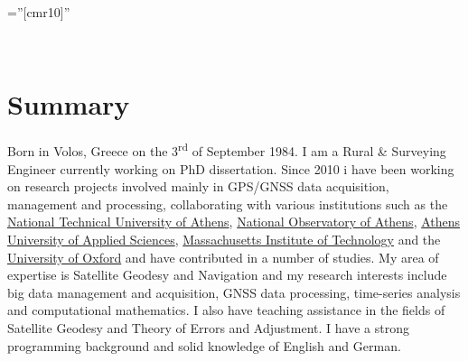 \documentclass[9pt]{extarticle} %
\begin{document}
\pagestyle{empty} %
\font\fb=''[cmr10]'' %

\par{\bigskip\par} %
%
\\
%
\medskip
%
\medskip

\section{Summary} \par
Born in Volos, Greece on the 3\textsuperscript{rd} of September 1984.
I am a Rural \& Surveying Engineer currently working on PhD dissertation. Since 2010 i have been working on research 
projects involved mainly in GPS/GNSS data acquisition, management and processing, collaborating with various 
institutions such as the \href{http://www.ntua.gr/}{National Technical University of Athens}, 
\href{http://www.noa.gr/index.php?lang=en}{National Observatory of Athens}, 
\href{http://www.teiath.gr/?lang=en}{Athens University of Applied Sciences}, 
\href{https://web.mit.edu/}{Massachusetts Institute of Technology} and the 
\href{http://www.ox.ac.uk/}{University of Oxford} and have contributed in a number of studies. My area of expertise 
is Satellite Geodesy and Navigation and my research interests include big data management and acquisition, GNSS 
data processing, time-series analysis and computational mathematics. I also have teaching assistance in the 
fields of Satellite Geodesy and Theory of Errors and Adjustment. I have a strong programming background and
solid knowledge of English and German.
\medskip
\end{document}
